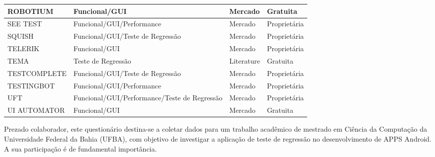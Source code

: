 \begin{table}[h!]
\begin{center}
\begin{tabular}{m{4cm}m{5cm}m{3cm}m{3cm}}
        ROBOTIUM \cite{robotium} & Funcional/GUI & Mercado & Gratuita\\\hline
        SEE TEST \cite{seetest} & Funcional/GUI/Performance & Mercado & Proprietária\\\hline
        SQUISH \cite{squish} & Funcional/GUI/Teste de Regressão & Mercado & Proprietária\\\hline
        TELERIK \cite{telerik} & Funcional/GUI & Mercado & Proprietária\\\hline
        TEMA \cite{tema} & Teste de Regressão & Literature & Gratuita\\\hline
        TESTCOMPLETE \cite{testcomplete} & Funcional/GUI/Teste de Regressão & Mercado & Proprietária\\\hline
        TESTINGBOT \cite{testingbot} & Funcional/GUI/Performance & Mercado & Proprietária\\\hline
        UFT \cite{uft} & Funcional/GUI/Performance/Teste de Regressão & Mercado & Proprietária\\\hline
        UI AUTOMATOR \cite{uiautomator} & Funcional/GUI & Mercado & Gratuita\\\hline
\end{tabular}
\end{center}
\end{table}





\label{sec:formulariopesquisa}


Prezado colaborador, este questionário destina-se a coletar dados para um trabalho acadêmico de mestrado em Ciência da Computação da Universidade Federal da Bahia (UFBA), com objetivo de investigar a aplicação de teste de regressão no desenvolvimento de \ac{APPS} Android. A sua participação é de fundamental importância.


